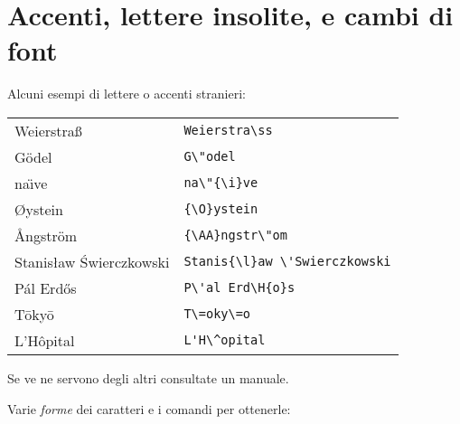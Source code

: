 \section{Accenti, lettere insolite, e cambi di font}

Alcuni esempi di lettere o accenti stranieri:
\begin{center}
\begin{tabular}{ll}
  Weierstra\ss & \verb!Weierstra\ss! \\
  G\"odel & \verb!G\"odel! \\
  na\"{\i}ve & \verb!na\"{\i}ve! \\
   {\O}ystein & \verb!{\O}ystein! \\
  {\AA}ngstr\"om & \verb!{\AA}ngstr\"om! \\
  Stanis{\l}aw \'Swierczkowski & 
    \verb!Stanis{\l}aw \'Swierczkowski! \\
  P\'al Erd\H{o}s &
    \verb!P\'al Erd\H{o}s! \\
  T\=oky\=o & \verb!T\=oky\=o! \\
  L'H\^opital & \verb!L'H\^opital!
\end{tabular}
\end{center}
Se ve ne servono degli altri consultate un manuale.

\medskip

Varie \emph{forme} dei caratteri e i comandi per
ottenerle:

\medskip

